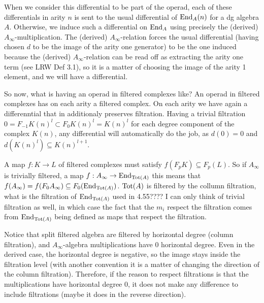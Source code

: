 \documentclass[twoside]{article}
\begin{document}
When we consider this differential to be part of the operad, each of these differentials in arity $n$ is sent to the usual differential of $\operatorname{End}_A(n)$ for a dg algebra $A$. Otherwise, we induce such a differential on $\operatorname{End}_A$ using precisely the (derived) $A_\infty$-multiplication. The (derived)  $A_\infty$-relation forces the usual differential (having chosen $d$ to be the image of the arity one generator) to be the one induced  because the (derived) $A_\infty$-relation can be read off as extracting the arity one term  (see LRW Def 3.1), so it is a matter of choosing the image of the arity 1 element, and we will have a differential.

 



So now, what is having an operad in filtered complexes like? An operad in filtered complexes has on each arity a filtered complex. On each arity we have again a differenntial that in additionaly preserves filtration. Having a trivial filtration $0=F_{-1}K(n)^l\subset F_0K(n)^l=K(n)^l$ for each degree component of the complex $K(n)$, any differential will automatically do the job, as $d(0)=0$ and $d(K(n)^l)\subseteq K(n)^{l+1}$.


A map $f:K\to L$ of filtered complexes must satisfy $f(F_pK)\subseteq F_p(L)$. So if $A_\infty$ is trivially filtered, a map $f:A_\infty\to\operatorname{End}_{\mathrm{Tot}(A)}$ this means that $f(A_\infty)=f(F_0A_\infty)\subseteq F_0(\operatorname{End}_{\mathrm{Tot}(A)})$. $\mathrm{Tot}(A)$ is filtered by the collumn filtration, what is the filtration of $\operatorname{End}_{\mathrm{Tot}(A)}$ used in 4.55???? I can only think of trivial filtration as well, in which case the fact that the $m_i$ respect the filtration comes from $\operatorname{End}_{\mathrm{Tot}(A)}$ being defined as maps that respect the filtration.



Notice that split filtered algebra are filtered by horizontal degree (column filtration), and $A_\infty$-algebra multiplications have $0$ horizontal degree. Even in the derived case, the horizontal degree is negative, so the image stays inside the filtration level (with another convention it is a matter of changing the direction of the column filtration).   Therefore, if the reason to respect filtrations is that the multiplications have  horizontal degree 0, it does not make any difference to include filtrations (maybe it does in the reverse direction).
\end{document}
